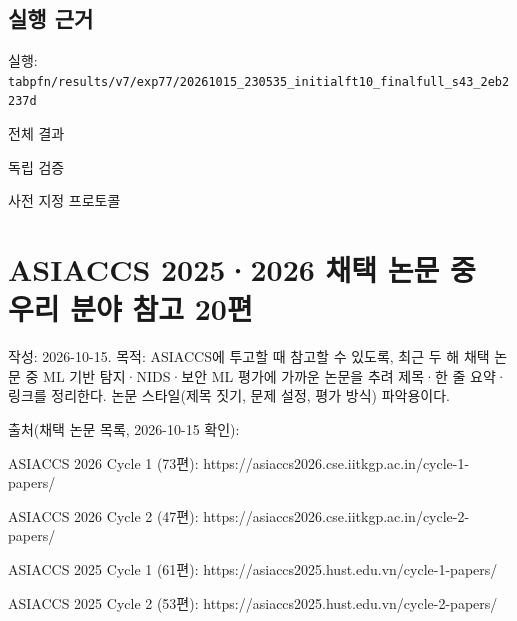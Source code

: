 \subsection{실행 근거}
\par\noindent \textbullet\enspace 실행: \texttt{tabpfn/\allowbreak{}\allowbreak{}r\allowbreak{}esults/\allowbreak{}\allowbreak{}v\allowbreak{}7/\allowbreak{}\allowbreak{}exp77/\allowbreak{}\allowbreak{}20261015\allowbreak{}\_\allowbreak{}\allowbreak{}230535\_\allowbreak{}\allowbreak{}initialf\allowbreak{}t10\_\allowbreak{}\allowbreak{}fina\allowbreak{}lfull\_\allowbreak{}\allowbreak{}s4\allowbreak{}3\_\allowbreak{}\allowbreak{}2eb223\allowbreak{}7d}


\par\noindent \textbullet\enspace 전체 결과


\par\noindent \textbullet\enspace 독립 검증


\par\noindent \textbullet\enspace 사전 지정 프로토콜




\section{ASIACCS 2025·2026 채택 논문 중 우리 분야 참고 20편}
작성: 2026-10-15. 목적: ASIACCS에 투고할 때 참고할 수 있도록, 최근 두 해 채택 논문 중 ML 기반 탐지·NIDS·보안 ML 평가에 가까운 논문을 추려 제목·한 줄 요약·링크를 정리한다. 논문 스타일(제목 짓기, 문제 설정, 평가 방식) 파악용이다.

출처(채택 논문 목록, 2026-10-15 확인):

\par\noindent \textbullet\enspace ASIACCS 2026 Cycle 1 (73편): https:/\allowbreak{}/\allowbreak{}asiaccs2026.cse.iitkgp.ac.in/\allowbreak{}cycle-1-papers/\allowbreak{}


\par\noindent \textbullet\enspace ASIACCS 2026 Cycle 2 (47편): https:/\allowbreak{}/\allowbreak{}asiaccs2026.cse.iitkgp.ac.in/\allowbreak{}cycle-2-papers/\allowbreak{}


\par\noindent \textbullet\enspace ASIACCS 2025 Cycle 1 (61편): https:/\allowbreak{}/\allowbreak{}asiaccs2025.hust.edu.vn/\allowbreak{}cycle-1-papers/\allowbreak{}


\par\noindent \textbullet\enspace ASIACCS 2025 Cycle 2 (53편): https:/\allowbreak{}/\allowbreak{}asiaccs2025.hust.edu.vn/\allowbreak{}cycle-2-papers/\allowbreak{}


